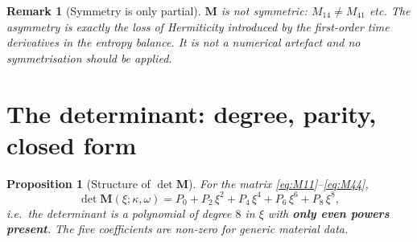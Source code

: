 \documentclass[11pt]{article}
\theoremstyle{plain}
\newtheorem{proposition}{Proposition}
\newtheorem{remark}{Remark}
\begin{document}
\begin{remark}[Symmetry is only partial]
\label{rem:partial-sym}
$\bm{M}$ is \emph{not} symmetric: $M_{14}\neq M_{41}$ etc. The asymmetry is
exactly the loss of Hermiticity introduced by the first-order time derivatives in
the entropy balance. It is not a numerical artefact and no symmetrisation should
be applied.
\end{remark}

\section{The determinant: degree, parity, closed form}
\label{sec:det}

\begin{proposition}[Structure of $\det\bm{M}$]
\label{prop:det-structure}
For the matrix \eqref{eq:M11}--\eqref{eq:M44},
\begin{equation}
  \det\bm{M}(\xi;\kappa,\omega)
  = P_0 + P_2\,\xi^2 + P_4\,\xi^4 + P_6\,\xi^6 + P_8\,\xi^8 ,
  \label{eq:det}
\end{equation}
i.e.\ the determinant is a polynomial of degree $8$ in $\xi$ with \textbf{only
even powers present}. The five coefficients are non-zero for generic material
data.
\end{proposition}
\end{document}
